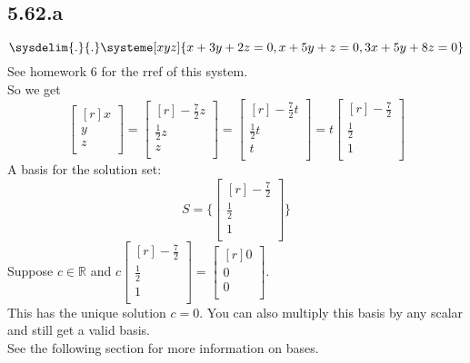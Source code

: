 \documentclass{report}
\begin{document}
\subsection{5.62.a}
\[ \sysdelim{.}{.}\systeme[xyz]{x+3y+2z=0,x+5y+z=0,3x+5y+8z=0} \]
See homework 6 for the rref of this system.\\
So we get
\[ \begin{bmatrix}[r]x\\y\\z\\\end{bmatrix}=\begin{bmatrix}[r]-\frac{7}{2}z\\\frac{1}{2}z\\z\\\end{bmatrix}=\begin{bmatrix}[r]-\frac{7}{2}t\\\frac{1}{2}t\\t\\\end{bmatrix}=t\begin{bmatrix}[r]-\frac{7}{2}\\\frac{1}{2}\\1\\\end{bmatrix} \]
A basis for the solution set:
\[ S=\{\begin{bmatrix}[r]-\frac{7}{2}\\\frac{1}{2}\\1\\\end{bmatrix}\} \]
Suppose $c\in\mathbb{R}$ and $c\begin{bmatrix}[r]-\frac{7}{2}\\ \frac{1}{2}\\1\\\end{bmatrix} = \begin{bmatrix}[r]0\\0\\0\\\end{bmatrix}$.\\
This has the unique solution $c=0$.
You can also multiply this basis by any scalar and still get a valid basis.\\
See the following section for more information on bases.
\end{document}

